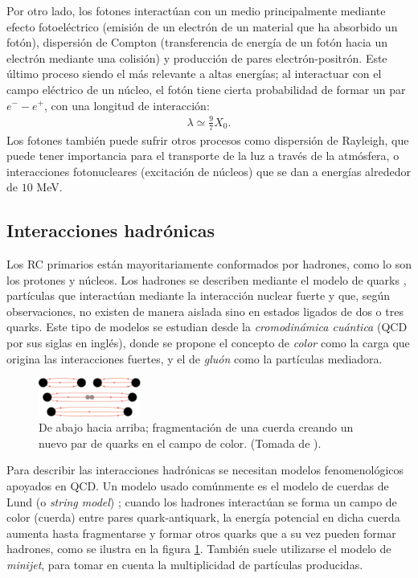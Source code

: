 	Por otro lado, los fotones interactúan con un medio principalmente mediante efecto fotoeléctrico (emisión de un electrón de un material que ha absorbido un fotón), dispersión de Compton (transferencia de energía de un fotón hacia un electrón mediante una colisión) y producción de pares electrón-positrón. Este último proceso siendo el más relevante a altas energías; al interactuar con el campo eléctrico de un núcleo, el fotón tiene cierta probabilidad de formar un par $e^{-}-e^{+}$, con una longitud de interacción:
	\begin{align}
	\lambda \simeq \frac{9}{7} X_0.
	\end{align}	
	Los fotones también puede sufrir otros procesos como dispersión de Rayleigh, que puede tener importancia para el transporte de la luz a través de la atmósfera, o interacciones fotonucleares (excitación de núcleos) que se dan a energías alrededor de $10$ MeV.
	
	\subsection{Interacciones hadrónicas}
	Los RC primarios están mayoritariamente conformados por hadrones, como lo son los protones y núcleos. Los hadrones se describen mediante el modelo de quarks \cite{DeAngelis2015}, partículas que interactúan mediante la interacción nuclear fuerte y que, según observaciones, no existen de manera aislada sino en estados ligados de dos o tres quarks. Este tipo de modelos se estudian desde la \textit{cromodinámica cuántica} (QCD por sus siglas en inglés), donde se propone el concepto de \textit{color} como la carga que origina las interacciones fuertes, y el de \textit{gluón} como la partículas mediadora. \\
		
	\begin{figure}
	\includegraphics[width=0.3\textwidth]{Figuras/string_frag} 
	\caption{De abajo hacia arriba; fragmentación de una cuerda creando un nuevo par de quarks en el campo de color. (Tomada de \cite{DeAngelis2015}).}
	\label{fig:string}
	\end{figure}		
	
	Para describir las interacciones hadrónicas se necesitan modelos fenomenológicos apoyados en QCD. Un modelo usado comúnmente es el modelo de cuerdas de Lund (o \textit{string model}) \cite{FragModels}; cuando los hadrones interactúan se forma un campo de color (cuerda) entre pares quark-antiquark, la energía potencial en dicha cuerda aumenta hasta fragmentarse y formar otros quarks que a su vez pueden formar hadrones, como se ilustra en la figura \ref{fig:string}. También suele utilizarse el modelo de \textit{minijet}, para tomar en cuenta la multiplicidad de partículas producidas. \\

